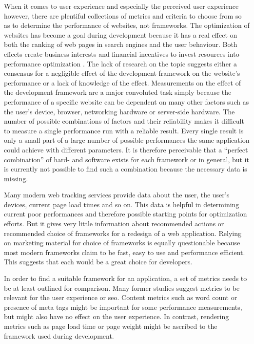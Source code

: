 \documentclass[a4paper, 12pt]{article}
\begin{document}
When it comes to user experience and especially the perceived user experience however, there are plentiful collections of metrics and criteria to choose from so as to determine the performance of websites, not frameworks.
The optimization of websites has become a goal during development because it has a real effect on both the ranking of web pages in search engines and the user behaviour.
Both effects create business interests and financial incentives to invest resources into performance optimization \citep{webprophet,effectsofwebpagecontents}.
The lack of research on the topic suggests either a consensus for a negligible effect of the development framework on the website's performance or a lack of knowledge of the effect.
Measurements on the effect of the development framework are a major convoluted task simply because the performance of a specific website can be dependent on many other factors such as the user's device, browser, networking hardware or server-side hardware.
The number of possible combinations of factors and their reliability makes it difficult to measure a single performance run with a reliable result.
Every single result is only a small part of a large number of possible performances the same application could achieve with different parameters.
It is therefore perceivable that a \enquote{perfect combination} of hard- and software exists for each framework or in general, but it is currently not possible to find such a combination because the necessary data is missing.

Many modern web tracking services provide data about the user, the user's devices, current page load times and so on.
This data is helpful in determining current poor performances and therefore possible starting points for optimization efforts.
But it gives very little information about recommended actions or recommended choice of frameworks for a redesign of a web application.
Relying on marketing material for choice of frameworks is equally questionable because most modern frameworks claim to be fast, easy to use and performance efficient.
This suggests that each would be a great choice for developers.

In order to find a suitable framework for an application, a set of metrics needs to be at least outlined for comparison.
Many former studies suggest metrics to be relevant for the user experience or \acrlong{seo}.
Content metrics such as word count or presence of meta tags might be important for some performance measurements, but might also have no effect on the user experience.
In contrast, rendering metrics such as page load time or page weight might be ascribed to the framework used during development.
\end{document}
